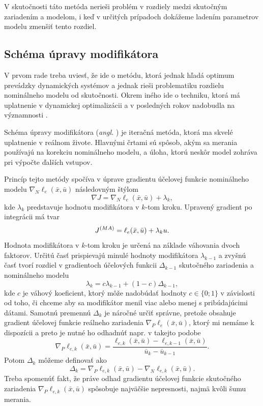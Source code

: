 V skutočnosti táto metóda nerieši problém v rozdiely medzi skutočným zariadením a modelom, i keď v určitých prípadoch dokážeme ladením parametrov modelu zmenšiť tento rozdiel.

\subsection{Schéma úpravy modifikátora}
V prvom rade treba uviesť, že ide o metódu, ktorá jednak hľadá optimum prevádzky dynamických systémov a jednak rieši problematiku rozdielu nominálneho modelu od skutočnosti. Okrem iného ide o techniku, ktorá má uplatnenie v dynamickej optimalizácii a v posledných rokov nadobudla na významnosti \cite{marchetti:modifier_adapt_scheme:2020}.

Schéma úpravy modifikátora (\textit{angl. }) je iteračná metóda, ktorá ma skvelé uplatnenie v reálnom živote. Hlavnými črtami sú spôsob, akým sa merania používajú na korekciu nominálneho modelu, a úloha, ktorú neskôr model zohráva pri výpočte ďalších vstupov.

Princíp tejto metódy spočíva v úprave gradientu účelovej funkcie nominálneho modelu $ \nabla_N\ell_e(\bar{x},\bar{u}) $ následovným štýlom
\begin{equation}
	\nabla J = \nabla_N\ell_e(\bar{x},\bar{u}) + \lambda_k,
\end{equation}
kde $ \lambda_k $ predstavuje hodnotu modifikátora v $ k $-tom kroku. Upravený gradient po integrácii má tvar 
\begin{equation}
	J^{\tiny{(MA)}} = \ell_e(\bar{x},\bar{u}) + \lambda_ku.
\end{equation}
Hodnota modifikátora v $ k $-tom kroku je určená na základe váhovania dvoch faktorov. Určitú časť prispievajú minulé hodnoty modifikátora $ \lambda_{k-1} $ a zvyšnú časť tvorí rozdiel v gradientoch účelových funkcii $ \Delta_{k-1} $ skutočného zariadenia a nominálneho modelu 
\begin{equation}
	\lambda_k = c\lambda_{k-1} + \left(1 - c\right)\Delta_{k-1},
\end{equation}
kde $ c $ je váhový koeficient, ktorý môže nadobúdať hodnoty $ c \in \lbrace 0; 1 \rbrace $ v závislosti od toho, či chceme aby sa modifikátor menil viac alebo menej s pribúdajúcimi dátami. Samotnú premennú $ \Delta_k $ je náročné určiť správne, pretože obsahuje gradient účelovej funkcie reálneho zariadenia $ \nabla_P\ell_e(\bar{x},\bar{u}) $, ktorý mi nemáme k dispozícii a preto je nutné ho odhadnúť napr. v takejto podobe
\begin{equation}
	\nabla_P\ell_{e,k}(\bar{x},\bar{u}) = \frac{\ell_{e,k}(\bar{x},\bar{u}) - \ell_{e,k-1}(\bar{x},\bar{u})}{\bar{u}_k - \bar{u}_{k-1}}.
\end{equation} 
Potom $ \Delta_k $ môžeme definovať ako 
\begin{equation}
	\Delta_k = \nabla_P\ell_{e,k}(\bar{x},\bar{u}) - \nabla_N\ell_{e,k}(\bar{x},\bar{u}).
\end{equation}
Treba spomenúť fakt, že práve odhad gradientu účelovej funkcie skutočného zariadenia $ \nabla_P\ell_{e,k}(\bar{x},\bar{u}) $ spôsobuje najväčšie nepresnosti, najmä kvôli šumu merania. 

